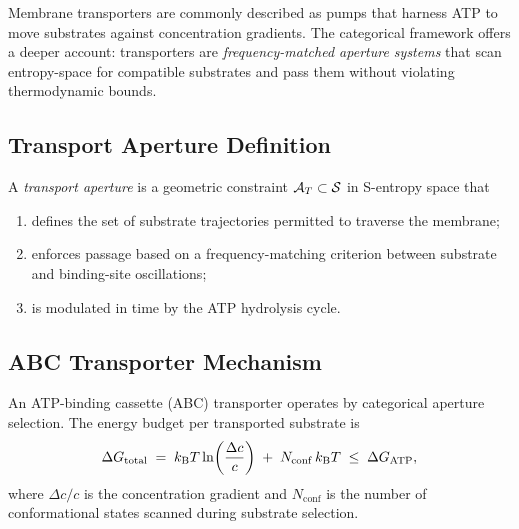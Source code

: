 Membrane transporters are commonly described as pumps that harness ATP to move
substrates against concentration gradients.  The categorical framework offers a
deeper account: transporters are \emph{frequency-matched aperture systems} that
scan entropy-space for compatible substrates and pass them without violating
thermodynamic bounds.

\subsection{Transport Aperture Definition}

\begin{definition}
\label{def:ch03-transport-aperture}
A \emph{transport aperture} is a geometric constraint $\mathcal{A}_T\subset\mathcal{S}$
in S-entropy space that
\begin{enumerate}[nosep]
    \item defines the set of substrate trajectories permitted to traverse the
          membrane;
    \item enforces passage based on a frequency-matching criterion between
          substrate and binding-site oscillations;
    \item is modulated in time by the ATP hydrolysis cycle.
\end{enumerate}
\end{definition}

\subsection{ABC Transporter Mechanism}

\begin{theorem}
\label{thm:ch03-abc-transporter}
An ATP-binding cassette (ABC) transporter operates by categorical aperture
selection.  The energy budget per transported substrate is
\begin{equation}
    \Delta G_{\mathrm{total}}
    \;=\;
    k_{\mathrm{B}} T\ln\!\left(\frac{\Delta c}{c}\right)
    \;+\;
    N_{\mathrm{conf}}\,k_{\mathrm{B}} T
    \;\leq\;
    \Delta G_{\mathrm{ATP}},
    \label{eq:ch03-abc-energy}
\end{equation}
where $\Delta c/c$ is the concentration gradient and $N_{\mathrm{conf}}$
is the number of conformational states scanned during substrate selection.
\end{theorem}

